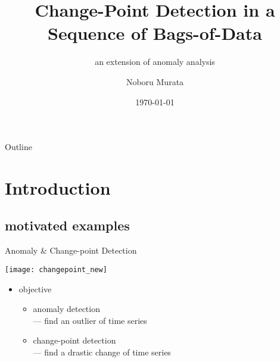 \documentclass[fleqn,aspectratio=1610]{beamer}
\author{Noboru Murata}
\date{\today}
\title{Change-Point Detection in a Sequence of Bags-of-Data}
\subtitle{an extension of anomaly analysis}
\institute{\url{https://noboru-murata.github.io/}}
\begin{document}
\maketitle
\begin{frame}{Outline}
\tableofcontents
\end{frame}


\section{Introduction}
\label{sec:org205a746}
\subsection{motivated examples}
\label{sec:org218a7df}
\begin{frame}[label={sec:org6b70b9c},t]{Anomaly \& Change-point Detection}
\begin{center}
\texttt{[image: changepoint\_new]}
\end{center}
\begin{itemize}
\item objective
\begin{itemize}
\item anomaly detection \\[0pt]
--- find an outlier of time series
\item \alert{change-point detection} \\[0pt]
--- find a drastic change of time series
\end{itemize}
\end{itemize}
\end{frame}
\end{document}

